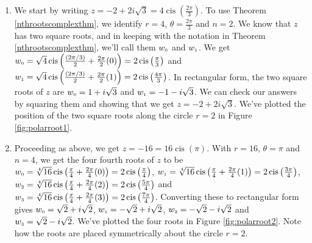 {
\begin{enumerate}

\item  We start by writing $z= - 2 + 2i\sqrt{3} = 4 \operatorname{cis}\left(\frac{2\pi}{3}\right)$.  To use Theorem \ref{nthrootscomplexthm}, we identify $r =4$,  $\theta = \frac{2\pi}{3}$ and $n=2$.  We know that $z$ has two square roots, and in keeping with the notation in Theorem \ref{nthrootscomplexthm}, we'll call them  $w_{\text{\tiny$0$}}$ and $w_{\text{\tiny$1$}}$.  We get $w_{\text{\tiny$0$}} = \sqrt{4} \operatorname{cis}\left(\frac{(2\pi/3)}{2} + \frac{2\pi}{2} (0)\right) = 2\operatorname{cis}\left(\frac{\pi}{3}\right)$ and $w_{\text{\tiny$1$}} = \sqrt{4} \operatorname{cis}\left(\frac{(2\pi/3)}{2} + \frac{2\pi}{2} (1)\right) = 2\operatorname{cis}\left(\frac{4\pi}{3}\right)$.  In rectangular form, the two square roots of $z$ are $w_{\text{\tiny$0$}} = 1+i\sqrt{3}$ and $w_{\text{\tiny$1$}} = -1-i\sqrt{3}$.  We can check our answers by squaring them and showing that we get $z= -2 + 2i\sqrt{3}$. We've plotted the position of the two square roots along the circle $r=2$ in Figure \ref{fig:polarroot1}.


\item  Proceeding as above, we get $z = -16 = 16 \operatorname{cis}(\pi)$.  With $r = 16$, $\theta = \pi$ and $n = 4$, we get the four fourth roots of $z$ to be  $w_{\text{\tiny$0$}} = \sqrt[4]{16} \operatorname{cis}\left(\frac{\pi}{4} + \frac{2\pi}{4} (0)\right) = 2\operatorname{cis}\left(\frac{\pi}{4}\right)$, $w_{\text{\tiny$1$}} = \sqrt[4]{16} \operatorname{cis}\left(\frac{\pi}{4} + \frac{2\pi}{4} (1)\right) = 2\operatorname{cis}\left(\frac{3\pi}{4}\right)$, $w_{\text{\tiny$2$}} = \sqrt[4]{16} \operatorname{cis}\left(\frac{\pi}{4} + \frac{2\pi}{4} (2)\right) = 2\operatorname{cis}\left(\frac{5\pi}{4}\right)$ and $w_{\text{\tiny$3$}} = \sqrt[4]{16} \operatorname{cis}\left(\frac{\pi}{4} + \frac{2\pi}{4} (3)\right) = 2\operatorname{cis}\left(\frac{7\pi}{4}\right)$.  Converting these to rectangular form gives $w_{\text{\tiny$0$}} = \sqrt{2} + i\sqrt{2}$,  $w_{\text{\tiny$1$}} = -\sqrt{2} + i\sqrt{2}$,  $w_{\text{\tiny$2$}} = -\sqrt{2} - i\sqrt{2}$ and  $w_{\text{\tiny$3$}} = \sqrt{2} - i\sqrt{2}$. We've plotted the four roots in Figure \ref{fig:polarroot2}. Note how the roots are placed symmetrically about the circle $r=2$.



\end{enumerate}}
